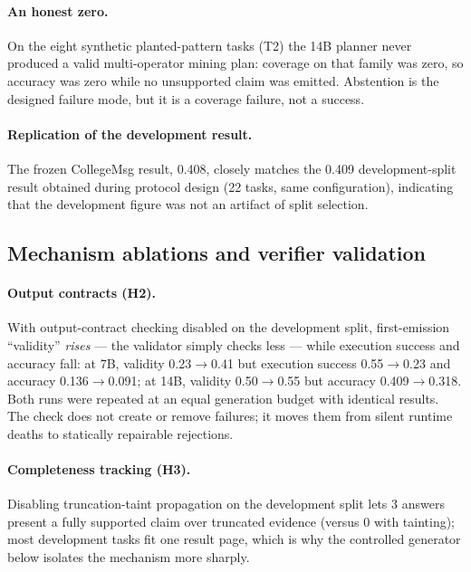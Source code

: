 \documentclass[11pt]{article}
\begin{document}
\paragraph{An honest zero.}
On the eight synthetic planted-pattern tasks (T2) the 14B planner never
produced a valid multi-operator mining plan: coverage on that family
was zero, so accuracy was zero while no unsupported claim was emitted.
Abstention is the designed failure mode, but it is a coverage failure,
not a success.

\paragraph{Replication of the development result.}
The frozen CollegeMsg result, 0.408, closely matches the 0.409
development-split result obtained during protocol design (22 tasks,
same configuration), indicating that the development figure was not an
artifact of split selection.

\subsection{Mechanism ablations and verifier validation}
\label{sec:mechanisms}

\paragraph{Output contracts (H2).}
With output-contract checking disabled on the development split,
first-emission ``validity'' \emph{rises} --- the validator simply
checks less --- while execution success and accuracy fall: at 7B,
validity 0.23$\to$0.41 but execution success 0.55$\to$0.23 and accuracy
0.136$\to$0.091; at 14B, validity 0.50$\to$0.55 but accuracy
0.409$\to$0.318. Both runs were repeated at an equal generation budget
with identical results. The check does not create or remove failures;
it moves them from silent runtime deaths to statically repairable
rejections.

\paragraph{Completeness tracking (H3).}
Disabling truncation-taint propagation on the development split lets 3
answers present a fully supported claim over truncated evidence (versus
0 with tainting); most development tasks fit one result page, which is
why the controlled generator below isolates the mechanism more sharply.
\end{document}
